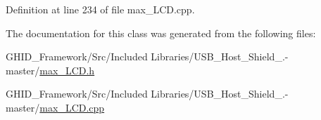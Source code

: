 \-Definition at line 234 of file max\-\_\-\-L\-C\-D.\-cpp.



\-The documentation for this class was generated from the following files\-:\begin{DoxyCompactItemize}
\item 
\-G\-H\-I\-D\-\_\-\-Framework/\-Src/\-Included Libraries/\-U\-S\-B\-\_\-\-Host\-\_\-\-Shield\-\_.-\/master/\hyperlink{max___l_c_d_8h}{max\-\_\-\-L\-C\-D.\-h}\item 
\-G\-H\-I\-D\-\_\-\-Framework/\-Src/\-Included Libraries/\-U\-S\-B\-\_\-\-Host\-\_\-\-Shield\-\_.-\/master/\hyperlink{max___l_c_d_8cpp}{max\-\_\-\-L\-C\-D.\-cpp}\end{DoxyCompactItemize}
